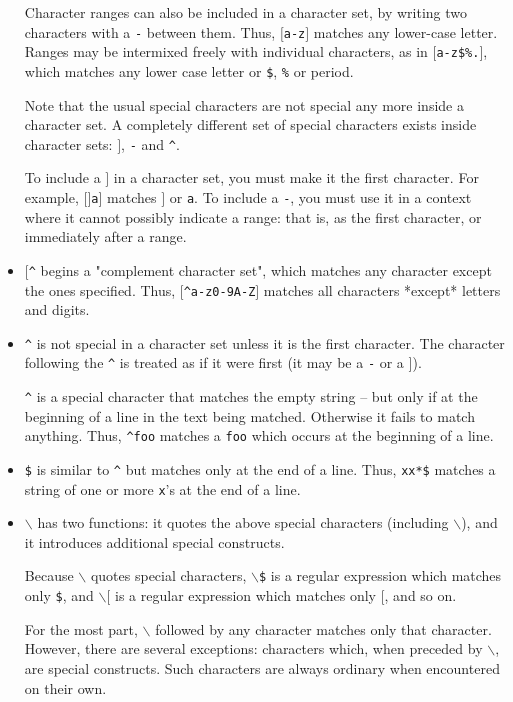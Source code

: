 \begin{itemize}
Character ranges can also be included in a character set, by
writing two characters with a {\tt -} between them. Thus, {\tt $[$a-z$]$}
matches any lower-case letter. Ranges may be intermixed freely
with individual characters, as in {\tt $[$a-z\$\%.$]$}, which matches any
lower case letter or {\tt \$}, {\tt \%} or period.

Note that the usual special characters are not special any more
inside a character set. A completely different set of special
characters exists inside character sets: {\tt $]$}, {\tt -} and {\tt ^}.

To include a {\tt $]$} in a character set, you must make it the first
character. For example, {\tt $[$$]$a$]$} matches {\tt $]$} or {\tt a}. To include
a {\tt -}, you must use it in a context where it cannot possibly
indicate a range: that is, as the first character, or
immediately after a range.

\item \rtfsp
{\tt $[$^} begins a "complement character set", which matches any
character except the ones specified. Thus, {\tt $[$^a-z0-9A-Z$]$}
matches all characters *except* letters and digits.

\item \rtfsp
{\tt ^} is not special in a character set unless it is the first
character. The character following the {\tt ^} is treated as if it
were first (it may be a {\tt -} or a {\tt $]$}).

{\tt ^} 
is a special character that matches the empty string -- but only
if at the beginning of a line in the text being matched. 
Otherwise it fails to match anything. Thus, {\tt ^foo} matches a
{\tt foo} which occurs at the beginning of a line.

\item \rtfsp
{\tt \$} 
is similar to {\tt ^} but matches only at the end of a line. Thus,
{\tt xx*\$} matches a string of one or more {\tt x}'s at the end of a line.

\item \rtfsp
{\tt $\backslash$} 
has two functions: it quotes the above special characters
(including {\tt $\backslash$}), and it introduces additional special constructs.

Because {\tt $\backslash$} quotes special characters, {\tt $\backslash$\$} is a regular
expression which matches only {\tt \$}, and {\tt $\backslash$$[$} is a regular
expression which matches only {\tt $[$}, and so on.

For the most part, {\tt $\backslash$} followed by any character matches only
that character. However, there are several exceptions:
characters which, when preceded by {\tt $\backslash$}, are special constructs. 
Such characters are always ordinary when encountered on their own.


\end{itemize}
